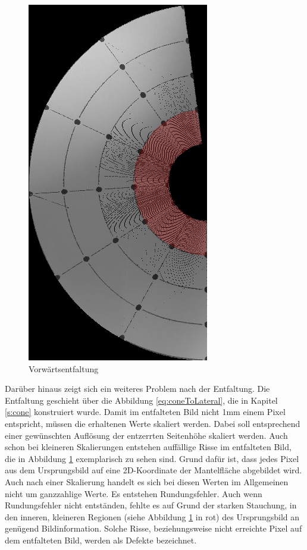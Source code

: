 \begin{figure}[!htb]
	\centering
	\includegraphics[angle=-90, width=.7\textwidth]{images/coneRaspUnWarpForwardHigh.png}
	\caption{Vorwärtsentfaltung}
	\label{fig:forwardHoles}
\end{figure}

Darüber hinaus zeigt sich ein weiteres Problem nach der Entfaltung. Die Entfaltung geschieht über die Abbildung \ref{eq:coneToLateral}, die in Kapitel \ref{s:cone} konstruiert wurde.
Damit im entfalteten Bild nicht 1mm einem Pixel entspricht, müssen die erhaltenen Werte skaliert werden. Dabei soll entsprechend einer gewünschten Auflösung der entzerrten Seitenhöhe skaliert werden.
Auch schon bei kleineren Skalierungen entstehen auffällige Risse im entfalteten Bild, die in Abbildung \ref{fig:forwardHoles} exemplarisch zu sehen sind. Grund dafür ist, dass jedes Pixel aus dem Ursprungsbild auf eine 2D-Koordinate der Mantelfläche abgebildet wird. Auch nach einer Skalierung handelt es sich bei diesen Werten im Allgemeinen nicht um ganzzahlige Werte. Es entstehen Rundungsfehler. Auch wenn Rundungsfehler nicht entständen, fehlte es auf Grund der starken Stauchung, in den inneren, kleineren Regionen (siehe Abbildung \ref{fig:forwardHoles} in rot) des Ursprungsbild an genügend Bildinformation. Solche Risse, beziehungsweise nicht erreichte Pixel auf dem entfalteten Bild, werden als Defekte bezeichnet.

